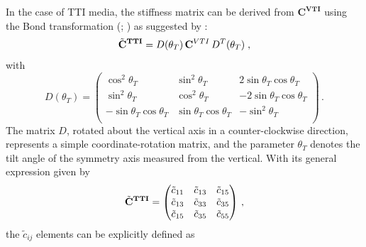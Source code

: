 In the case of TTI media, the stiffness matrix can be derived from $\mathbf{C}^\mathbf{VTI}$ using the Bond transformation (\cite{Bond:43}; \cite{Carcione:07}) as suggested by \citet{Oh:20}: 
\begin{equation}
    \Tilde{\mathbf{C}}^\mathbf{TTI} = D(\theta_T)\,\mathbf{C}^{VTI}\,D^T(\theta_T)\;,
\end{equation}
with 
\begin{equation}
    D(\theta_T) = 
    \begin{pmatrix}
    \cos^{2}\theta_T & \sin^{2}\theta_T & 2\sin\theta_T\cos\theta_T \\
    \sin^{2}\theta_T & \cos^{2}\theta_T & -2\sin\theta_T\cos\theta_T \\
    -\sin\theta_T\cos\theta_T & \sin\theta_T\cos\theta_T & -\sin^{2}\theta_T \\
    \end{pmatrix}\,.
    \label{eq:d_vti}
\end{equation}
The matrix $\textit{D}$, rotated about the vertical axis in a counter-clockwise direction, represents a simple coordinate-rotation matrix, and the parameter $\theta_T$ denotes the tilt angle of the symmetry axis measured from the vertical. With its general expression given by
\begin{equation}
    \Tilde{\mathbf{C}}^\mathbf{TTI} = 
    \begin{pmatrix}
    \Tilde{c}_{11} & \Tilde{c}_{13} & \Tilde{c}_{15} \\
    \Tilde{c}_{13} & \Tilde{c}_{33} & \Tilde{c}_{35} \\
    \Tilde{c}_{15} & \Tilde{c}_{35} & \Tilde{c}_{55} \\
    \end{pmatrix}\,,
    \label{eq:c_tti_3x3}
\end{equation}
the $\tilde{c}_{ij}$ elements can be explicitly defined as
